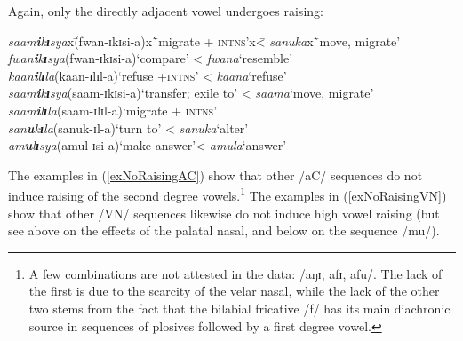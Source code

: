 Again, only the directly adjacent vowel undergoes raising:
\begin{exe}
\ex \label{exNoSpreadingAfterRaisinganmn}
\begin{tabbing}
\textit{saam\textbf{i}k\textbf{ɪ}sya}x\=(\degree fwan-ɪkɪsi-a)x\=`migrate + \textsc{intns}'x\= < \textit{sanuka}x\=`move, migrate'\kill%
\textit{fwan\textbf{i}k\textbf{ɪ}sya}\>(\degree fwan-ɪkɪsi-a)\>`compare'\> < \textit{fwana}\>\lq resemble'
\\\textit{kaan\textbf{i}l\textbf{ɪ}la}\>(\degree kaan-ɪlɪl-a)\>`refuse +\textsc{intns}'\> < \textit{kaana}\>`refuse'
\\\textit{saam\textbf{i}k\textbf{ɪ}sya}\>(\degree saam-ɪkɪsi-a)\>`transfer; exile to'\> < \textit{saama}\>`move, migrate'
\\\textit{saam\textbf{i}l\textbf{ɪ}la}\>(\degree saam-ɪlɪl-a)\>`migrate + \textsc{intns}'
\\\textit{san\textbf{u}k\textbf{ɪ}la}\>(\degree sanuk-ɪl-a)\>`turn to'\> < \textit{sanuka}\>\lq alter'\\
\textit{am\textbf{u}l\textbf{ɪ}sya}\>(\degree amul-ɪsi-a)\>`make answer'\>< \textit{amula}\>`answer'
\end{tabbing}
\end{exe}

The examples in (\ref{exNoRaisingAC}) show that other /aC/ sequences do not induce raising of the second degree vowels.\footnote{A few combinations are not attested in the data: /aŋɪ, afɪ, afu/. The lack of the first is due to the scarcity of the velar nasal, while the lack of the other two stems from the fact that the bilabial fricative /f/ has its main diachronic source in sequences of  plosives followed by a first degree vowel.} The examples in (\ref{exNoRaisingVN}) show that other /VN/ sequences likewise do not induce high vowel raising (but see above on the effects of the palatal nasal, and below on the sequence /mu/).
\clearpage

